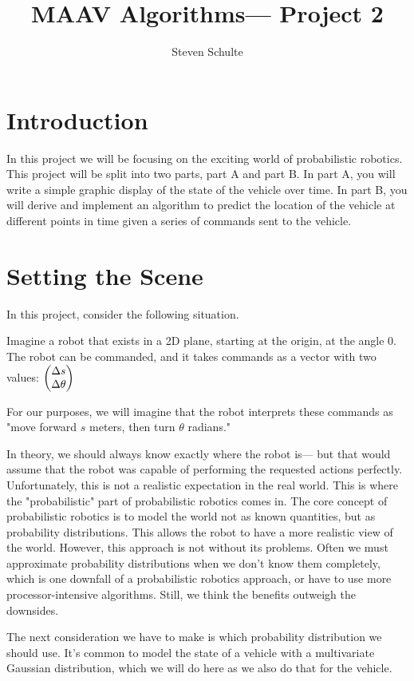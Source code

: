 \documentclass[12pt]{article}
\title{MAAV Algorithms— Project 2}
\author{Steven Schulte}
\date{}
\newcommand*\colvec[3][]{
	\begin{pmatrix}\ifx\relax#1\relax\else#1\\\fi#2\\#3\end{pmatrix}
}
\begin{document}
\maketitle

\section{Introduction}

In this project we will be focusing on the exciting world of probabilistic robotics. This project will be split into two parts, part A and part B. In part A, you will write a simple graphic display of the state of the vehicle over time. In part B, you will derive and implement an algorithm to predict the location of the vehicle at different points in time given a series of commands sent to the vehicle.

\section{Setting the Scene}

In this project, consider the following situation.

Imagine a robot that exists in a 2D plane, starting at the origin, at the angle $0$. The robot can be commanded, and it takes commands as a vector with two values: $\colvec{\Delta s}{\Delta \theta}$

For our purposes, we will imagine that the robot interprets these commands as "move forward $s$ meters, then turn $\theta$ radians."

In theory, we should always know exactly where the robot is— but that would assume that the robot was capable of performing the requested actions perfectly. Unfortunately, this is not a realistic expectation in the real world. This is where the "probabilistic" part of probabilistic robotics comes in. The core concept of probabilistic robotics is to model the world not as known quantities, but as probability distributions. This allows the robot to have a more realistic view of the world. However, this approach is not without its problems. Often we must approximate probability distributions when we don't know them completely, which is one downfall of a probabilistic robotics approach, or have to use more processor-intensive algorithms. Still, we think the benefits outweigh the downsides.

The next consideration we have to make is which probability distribution we should use. It's common to model the state of a vehicle with a multivariate Gaussian distribution, which we will do here as we also do that for the vehicle.
\end{document}
